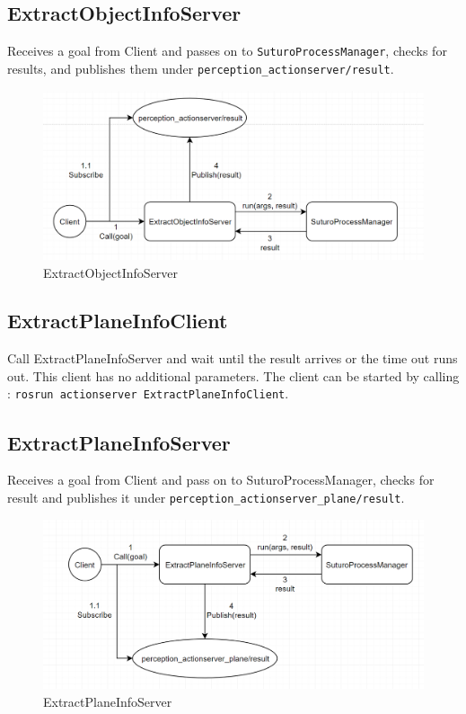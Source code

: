 \documentclass[main.tex]{subfiles}
\begin{document}
            \subsection{ExtractObjectInfoServer}
Receives a goal from Client and passes on to \texttt{SuturoProcessManager}, checks for results, and publishes them under \texttt{perception\_actionserver/result}. 
            \begin{figure}[H]
                \centering
                 \includegraphics[width=1\textwidth]{pictures/perception/suturo_ExtractObjectInfoServer.png}
                \caption{ExtractObjectInfoServer}
              \end{figure}

            \subsection{ExtractPlaneInfoClient}
Call ExtractPlaneInfoServer and wait until the result arrives or the time out runs out. This client has no additional parameters.
The client can be started by calling : \texttt{rosrun actionserver ExtractPlaneInfoClient}.

            \subsection{ExtractPlaneInfoServer}
Receives a goal from Client and pass on to SuturoProcessManager, checks for result and publishes it under \texttt{perception\_actionserver\_plane/result}.
            \begin{figure}[H]
                \centering
                 \includegraphics[width=1\textwidth]{pictures/perception/suturo_ExtractPlaneInfoServer.png}
                \caption{ExtractPlaneInfoServer}
              \end{figure}
\end{document}
